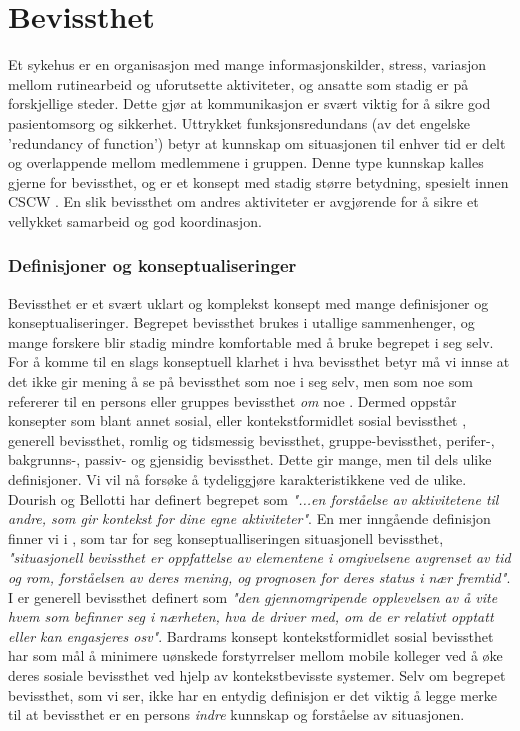 \section{Bevissthet}
\label{chp: awareness}

Et sykehus er en organisasjon med mange informasjonskilder, stress, variasjon mellom rutinearbeid og uforutsette aktiviteter, og ansatte som stadig er på forskjellige steder. Dette gjør at kommunikasjon er svært viktig for å sikre god pasientomsorg og sikkerhet\cite{Klemets12}. Uttrykket funksjonsredundans (av det engelske 'redundancy of function') betyr at kunnskap om situasjonen til enhver tid er delt og overlappende mellom medlemmene i gruppen\cite{KlemetsRedundancy}. Denne type kunnskap kalles gjerne for bevissthet, og er et konsept med stadig større betydning, spesielt innen CSCW \cite{Dourish92}. En slik bevissthet om andres aktiviteter er avgjørende for å sikre et vellykket samarbeid og god koordinasjon\cite{KlemetsRedundancy}. 

\subsubsection{Definisjoner og konseptualiseringer}
Bevissthet er et svært uklart og komplekst konsept med mange definisjoner og konseptualiseringer\cite{KlemetsRedundancy, Gutwin04, Schmidt02}. Begrepet bevissthet brukes i utallige sammenhenger, og mange forskere blir stadig mindre komfortable med å bruke begrepet i seg selv. For å komme til en slags konseptuell klarhet i hva bevissthet betyr må vi innse at det ikke gir mening å se på bevissthet som noe i seg selv, men som noe som refererer til en persons eller gruppes bevissthet \emph{om} noe \cite{Schmidt02}. Dermed oppstår konsepter som blant annet sosial, eller kontekstformidlet sosial bevissthet \cite{Bardram04}, generell bevissthet\cite{Gross13}, romlig og tidsmessig bevissthet\cite{Randell}, gruppe-bevissthet\cite{Gutwin04}, perifer-, bakgrunns-, passiv- og gjensidig bevissthet\cite{Schmidt02}. Dette gir mange, men til dels ulike definisjoner. Vi vil nå forsøke å tydeliggjøre karakteristikkene ved de ulike. Dourish og Bellotti har definert begrepet som \emph{"...en forståelse av aktivitetene til andre, som gir kontekst for dine egne aktiviteter"}. En mer inngående definisjon finner vi i \cite{Endsly95}, som tar for seg konseptualliseringen situasjonell bevissthet, \emph{"situasjonell bevissthet er oppfattelse av elementene i omgivelsene avgrenset av tid og rom, forståelsen av deres mening, og prognosen for deres status i nær fremtid"}. I \cite{Gross13} er generell bevissthet definert som \emph{"den gjennomgripende opplevelsen av å vite hvem som befinner seg i nærheten, hva de driver med, om de er relativt opptatt eller kan engasjeres osv"}. Bardrams konsept kontekstformidlet sosial bevissthet har som mål å minimere uønskede forstyrrelser mellom mobile kolleger ved å øke deres sosiale bevissthet ved hjelp av kontekstbevisste systemer\cite{Bardram04}. Selv om begrepet bevissthet, som vi ser, ikke har en entydig definisjon er det viktig å legge merke til at bevissthet er en persons \emph{indre} kunnskap og forståelse av situasjonen\cite{Gross13}. 

